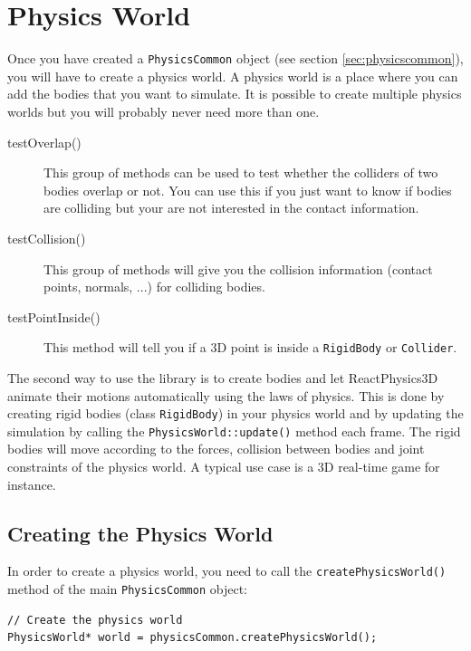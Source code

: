 \documentclass[a4paper,12pt]{article}
\begin{document}
   \section{Physics World}
     \label{sec:physicsworld}

    Once you have created a \texttt{PhysicsCommon} object (see section \ref{sec:physicscommon}), you will have to create a physics world. A physics world is
    a place where you can add the bodies that you want to simulate. It is possible to create multiple physics worlds but you will probably never need more
    than one. \\
 
    \begin{description}
       \item[testOverlap()] This group of methods can be used to test whether the colliders of two bodies overlap or not. You can use this if you just want to
	       know if bodies are colliding but your are not interested in the contact information. 
       \item[testCollision()] This group of methods will give you the collision information (contact points, normals, ...) for colliding bodies.
       \item[testPointInside()] This method will tell you if a 3D point is inside a \texttt{RigidBody} or \texttt{Collider}. 
    \end{description}

    The second way to use the library is to create bodies and let ReactPhysics3D animate their motions automatically using the laws of physics. This is
    done by creating rigid bodies (class \texttt{RigidBody}) in your physics world and by updating the simulation by calling the 
    \texttt{PhysicsWorld::update()} method each frame. The rigid bodies will move according to the forces, collision between bodies and joint constraints of
    the physics world. A typical use case is a 3D real-time game for instance.

    \subsection{Creating the Physics World}

    In order to create a physics world, you need to call the \texttt{createPhysicsWorld()} method of the main \texttt{PhysicsCommon} object: \\

    \begin{lstlisting}
// Create the physics world
PhysicsWorld* world = physicsCommon.createPhysicsWorld();
    \end{lstlisting}
\end{document}
